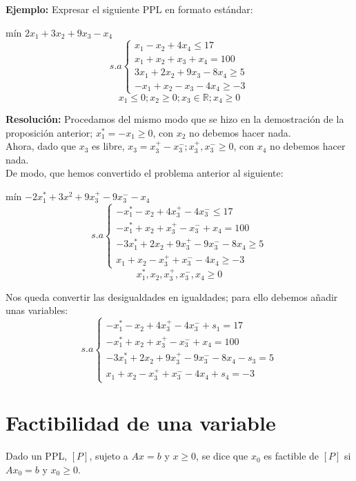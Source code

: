 \documentclass[11pt,fleqn]{book} %
\begin{document}
\textbf{Ejemplo: } Expresar el siguiente PPL en formato estándar: \\
\begin{center}
  mín $2x_1+3x_2+9x_3-x_4$
  $$
  s.a\left\lbrace
  \begin{array}{l}
	x_1-x_2+4x_4 \leq 17 \\
	x_1+x_2+x_3+x_4 = 100 \\
	3x_1+2x_2+9x_3-8x_4  \geq 5 \\
	-x_1+x_2-x_3-4x_4 \geq -3
  \end{array}
  \right.
  $$
  $$x_1 \leq 0; x_2 \geq 0; x_3 \in \mathbb{R} ; x_4 \geq 0$$
\end{center}
\textbf{Resolución: } Procedamos del mismo modo que se hizo en la demostración de la proposición anterior;
$x_1^*=-x_1\geq 0$, 
con $x_2$ no debemos hacer nada.\\
Ahora, dado que $x_3$ es libre,
$x_3=x_3^+-x_3^-; x_3^+, x_3^- \geq 0$, con $x_4$ no debemos hacer nada. \\
De modo, que hemos convertido el problema anterior al siguiente: 
\begin{center}
  mín $-2x_1^*+3x^2+9x_3^+-9x_3^--x_4$
  $$s.a\left\lbrace
  \begin{array}{l}
	-x_1^*-x_2+4x_3^+-4x_3^- \leq 17 \\
	-x_1^*+x_2+x_3^+-x_3^-+x_4 = 100 \\
	-3x_1^*+2x_2+9x_3^+-9x_3^--8x_4 \geq 5 \\
	x_1+x_2-x_3^++x_3^--4x_4 \geq -3
  \end{array}
  \right.$$
  $$x_1^*, x_2, x_3^+, x_3^-, x_4 \geq 0$$
\end{center}
Nos queda convertir las desigualdades en igualdades; para ello debemos añadir unas variables:
$$
s.a\left\lbrace
\begin{array}{l}
  -x_1^*-x_2+4x_3^+-4x_3^- + s_1= 17 \\
  -x_1^*+x_2+x_3^+-x_3^-+x_4 = 100 \\
  -3x_1^*+2x_2+9x_3^+-9x_3^--8x_4 -s_3= 5 \\
  x_1+x_2-x_3^++x_3^--4x_4 + s_4 =  -3
\end{array}
\right.
$$

\section{Factibilidad de una variable}
\begin{definition}
  Dado un PPL, $[P]$, sujeto a $Ax=b$ y $x\geq 0$, se dice que $x_0$ es factible de $[P]$ si $Ax_0=b$ y $x_0 \geq 0$.
\end{definition}
\end{document}
